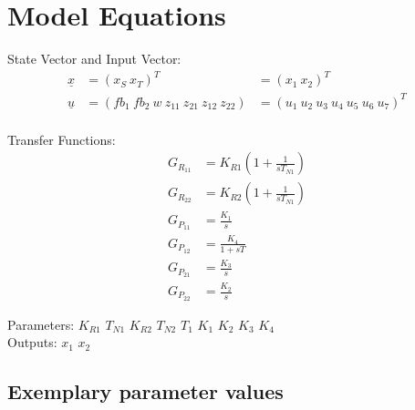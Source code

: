 \documentclass[10pt,a4paper]{article}
\begin{document}
	
	\begin{tabular}{ll}

	\end{tabular}
	
	
	\section{Model Equations} %
	
	State Vector and Input Vector:
	\begin{align*}
		\underline{x} &= (x_S \ x_T)^T &= (x_1 \ x_2)^T \\
		\underline{u} &= (fb_1 \ fb_2 \ w \ z_{11} \ z_{21} \ z_{12} \ z_{22})
					  &= (u_1 \ u_2 \ u_3 \ u_4 \ u_5 \ u_6 \ u_7)^T \\
	\end{align*}
	
	\noindent Transfer Functions:			
	\begin{subequations}
	\begin{align}
		G_{R_{11}} &= K_{R1}\left(1 + \frac{1}{sT_{N1}}\right) \\ 
		G_{R_{22}} &= K_{R2}\left(1 + \frac{1}{sT_{N1}}\right) \\
		G_{P_{11}} &= \frac{K_1}{s} \\
		G_{P_{12}} &= \frac{K_4}{1 + sT} \\
		G_{P_{21}} &= \frac{K_3}{s} \\
		G_{P_{22}} &= \frac{K_2}{s} 				
	\end{align}
	\end{subequations}

	\noindent
	Parameters: $K_{R1}$ $T_{N1}$ $K_{R2}$ $T_{N2}$ $T_1$ $K_1$ $K_2$ $K_3$ $K_4$ %
	\\
	Outputs: $x_1$ $x_2$ \\%
	

	
	\subsection{Exemplary parameter values}
	
\end{document}
